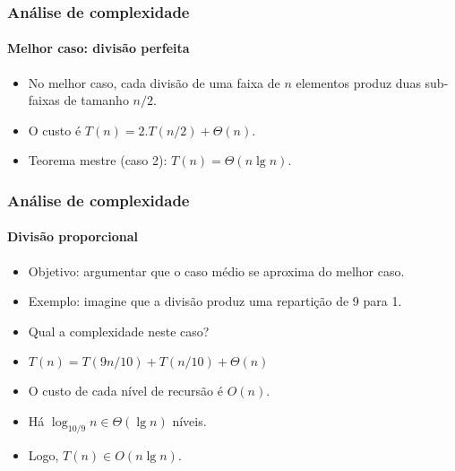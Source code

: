 \documentclass{beamer}
\begin{document}
\begin{frame}

  \frametitle{Análise de complexidade}
  \framesubtitle{Melhor caso: divisão perfeita}

  \begin{itemize}
    \item No melhor caso, cada divisão de uma faixa de $n$ elementos
      produz duas sub-faixas de tamanho $n/2$.
    \item O custo é $T(n) = 2.T(n/2) + \Theta(n)$.
    \item Teorema mestre (caso 2): $T(n) = \Theta(n \lg n)$.
  \end{itemize}
\end{frame}

\begin{frame}

  \frametitle{Análise de complexidade}
  \framesubtitle{Divisão proporcional}

  \begin{itemize}

    \item Objetivo: argumentar que o caso médio se aproxima do melhor caso.

    \item Exemplo: imagine que a divisão produz uma repartição de 9 para 1.

    \item Qual a complexidade neste caso?

    \item $T(n) = T(9n/10) + T(n/10) + \Theta(n)$

    \item O custo de cada nível de recursão é $O(n)$.

    \item Há $\log_{10/9} n \in \Theta(\lg n)$ níveis.

    \item Logo, $T(n) \in O(n \lg n)$.

  \end{itemize}

\end{frame}
\end{document}
